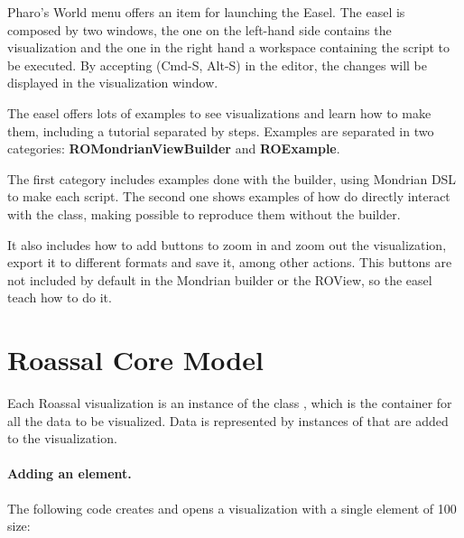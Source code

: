 \documentclass[a4paper,10pt,twoside]{book}
\begin{document}
Pharo's World menu offers an item for launching the Easel. The easel is composed by two windows, the one on the left-hand side contains the visualization and the one in the right hand a workspace containing the script to be executed. By accepting (Cmd-S, Alt-S) in the editor, the changes will be displayed in the visualization window.

The easel offers lots of examples to see visualizations and learn how to make them, including a tutorial separated by steps. Examples are separated in two categories: \textbf{ROMondrianViewBuilder} and \textbf{ROExample}. 


The first category includes examples done with the builder, using Mondrian DSL to make each script. The second one shows examples of how do directly interact with the  class, making possible to reproduce them without the builder.

It also includes how to add buttons to zoom in and zoom out the visualization, export it to different formats and save it, among other actions. This buttons are not included by default in the Mondrian builder or the ROView, so the easel teach how to do it.



\section{Roassal Core Model}



Each Roassal visualization is an instance of the class , which is the container for all the data to be visualized.
Data is represented by instances of  that are added to the visualization.  %

\paragraph{Adding an element.} The following code creates and opens a visualization with a single element of 100 size:
\end{document}
